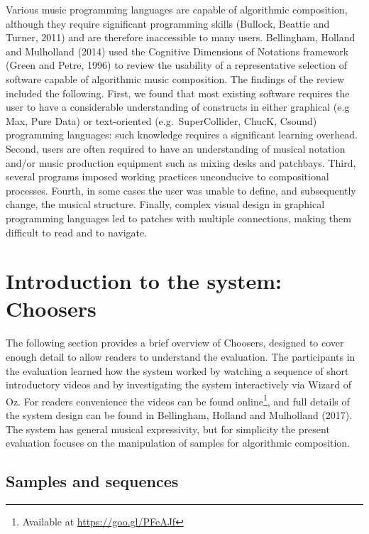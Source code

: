 \documentclass{ppig}
\begin{document}
Various music programming languages are capable of algorithmic
composition, although they require significant programming skills
(Bullock, Beattie and Turner, 2011) and are therefore inaccessible to
many users. Bellingham, Holland and Mulholland (2014) used the Cognitive
Dimensions of Notations framework (Green and Petre, 1996) to review the
usability of a representative selection of software capable of
algorithmic music composition. The findings of the review included the
following. First, we found that most existing software requires the user
to have a considerable understanding of constructs in either graphical
(e.g Max, Pure Data) or text-oriented (e.g.~SuperCollider, ChucK,
Csound) programming languages: such knowledge requires a significant
learning overhead. Second, users are often required to have an
understanding of musical notation and/or music production equipment such
as mixing desks and patchbays. Third, several programs imposed working
practices unconducive to compositional processes. Fourth, in some cases
the user was unable to define, and subsequently change, the musical
structure. Finally, complex visual design in graphical programming
languages led to patches with multiple connections, making them
difficult to read and to navigate.

\hypertarget{sec:systemintro}{%
\section{Introduction to the system: Choosers}\label{sec:systemintro}}

The following section provides a brief overview of Choosers, designed to
cover enough detail to allow readers to understand the evaluation. The
participants in the evaluation learned how the system worked by watching
a sequence of short introductory videos and by investigating the system
interactively via Wizard of Oz. For readers convenience the videos can
be found online\footnote{Available at \url{https://goo.gl/PFeAJf}}, and
full details of the system design can be found in Bellingham, Holland
and Mulholland (2017). The system has general musical expressivity, but
for simplicity the present evaluation focuses on the manipulation of
samples for algorithmic composition.

\hypertarget{samples-and-sequences}{%
\subsection{Samples and sequences}\label{samples-and-sequences}}
\end{document}
